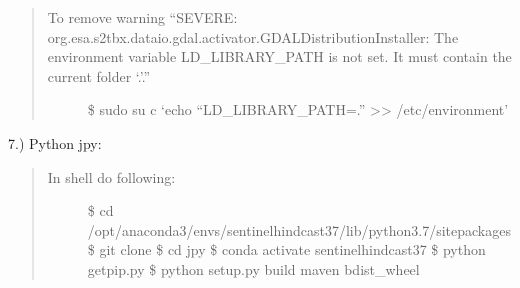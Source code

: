 \documentclass[letterpaper,10pt,english]{sphinxmanual}
\begin{document}
\begin{quote}
\begin{description}
\item[{To remove warning “SEVERE: org.esa.s2tbx.dataio.gdal.activator.GDALDistributionInstaller: The environment variable LD\_LIBRARY\_PATH is not set. It must contain the current folder ‘.’.”}] \leavevmode
\$ sudo su \sphinxhyphen{}c ‘echo “LD\_LIBRARY\_PATH=.” \textgreater{}\textgreater{} /etc/environment’

\end{description}
\end{quote}

7.) Python \sphinxhyphen{} jpy: 
\begin{quote}
\begin{description}
\item[{In shell do following:}] \leavevmode
\$ cd /opt/anaconda3/envs/sentinel\sphinxhyphen{}hindcast\sphinxhyphen{}37/lib/python3.7/site\sphinxhyphen{}packages
\$ git clone 
\$ cd jpy
\$ conda activate sentinel\sphinxhyphen{}hindcast\sphinxhyphen{}37
\$ python get\sphinxhyphen{}pip.py
\$ python setup.py build maven bdist\_wheel

\end{description}
\end{quote}
\end{document}
